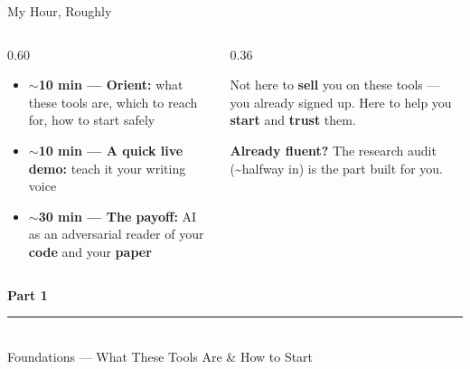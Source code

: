 \documentclass[aspectratio=169, 10pt]{beamer}
\begin{document}
\begin{frame}{My Hour, Roughly}
\vskip4pt
\begin{columns}[T]
\begin{column}{0.60\textwidth}
\begin{tcolorbox}[keybox, title={\faClock\quad The next 60 minutes}, top=3pt, bottom=3pt]
\small
\begin{itemize}\setlength{\itemsep}{5pt}
  \item \textbf{$\sim$10 min --- Orient:} what these tools are, which to reach for, how to start safely
  \item \textbf{$\sim$10 min --- A quick live demo:} teach it your writing voice
  \item \textbf{$\sim$30 min --- The payoff:} AI as an adversarial reader of your \textbf{code} and your \textbf{paper}
\end{itemize}
\end{tcolorbox}
\end{column}
\begin{column}{0.36\textwidth}
\begin{tcolorbox}[accentbox, top=3pt, bottom=3pt]
\small Not here to \textbf{sell} you on these tools --- you already signed up. Here to help you \textbf{start} and \textbf{trust} them.
\end{tcolorbox}
\vskip4pt
\begin{tcolorbox}[quotebox, top=3pt, bottom=3pt]
\scriptsize \textbf{Already fluent?} The research audit (\textasciitilde{}halfway in) is the part built for you.
\end{tcolorbox}
\end{column}
\end{columns}
\end{frame}

{
\begin{frame}
\centering\vfill
{\fontsize{22}{28}\bfseries\selectfont\color{white} Part 1}\\[6pt]
{\color{UVMGold}\rule{5cm}{0.8pt}}\\[6pt]
{\normalsize\color{UVMGold} Foundations --- What These Tools Are \& How to Start}
\vfill
\end{frame}
}
\end{document}
